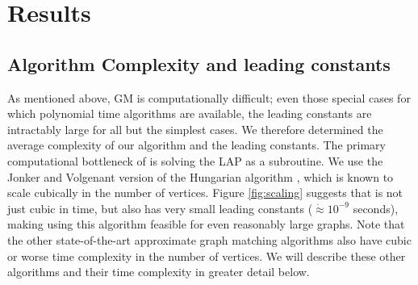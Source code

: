 \documentclass[11pt]{article}
\begin{document}
\section{Results} %
\label{sec:results}





\subsection{Algorithm Complexity and leading constants} %
\label{sub:const}

As mentioned above, GM is computationally difficult; even those special cases for which polynomial time algorithms are available, the leading constants are intractably large for all but the simplest cases. We therefore determined the average complexity of our algorithm and the leading constants.  The primary computational bottleneck of \FAQ is solving the LAP as a subroutine.  We use the Jonker and Volgenant version of the Hungarian algorithm \cite{Jonker1987, Burkard2009}, which is known to scale cubically in the number of vertices.  Figure \ref{fig:scaling} suggests that \FAQ is not just cubic in time, but also has very small leading constants ($\dot{\approx} 10^{-9}$ seconds), making using this algorithm feasible for even reasonably large graphs.  Note that the other state-of-the-art approximate graph matching algorithms also have cubic or worse time complexity in the number of vertices.  We will describe these other algorithms and their time complexity in greater detail below.
\end{document}
